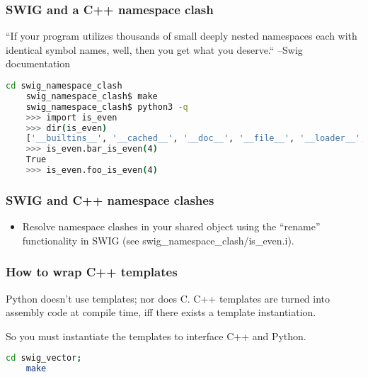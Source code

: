 \documentclass{beamer}
\begin{document}
\begin{frame}[fragile]
  \frametitle{SWIG and a C++ namespace clash}
  ``If your program utilizes thousands of small deeply nested namespaces each with identical symbol names, well, then
  you get what you deserve.`` --Swig documentation
  \begin{lstlisting}[language=bash]
    cd swig_namespace_clash
    swig_namespace_clash$ make
    swig_namespace_clash$ python3 -q
    >>> import is_even
    >>> dir(is_even)
    ['__builtins__', '__cached__', '__doc__', '__file__', '__loader__', '__name__', '__package__', '__spec__', '_is_even', '_newclass', '_object', '_swig_getattr', '_swig_getattr_nondynamic', '_swig_property', '_swig_repr', '_swig_setattr', '_swig_setattr_nondynamic', 'bar_is_even', 'foo_is_even']
    >>> is_even.bar_is_even(4)
    True
    >>> is_even.foo_is_even(4)
   \end{lstlisting}
\end{frame}

\begin{frame}[fragile]
  \frametitle{SWIG and C++ namespace clashes}
  \begin{itemize}
    \item Resolve namespace clashes in your shared object using the ``rename'' functionality in SWIG (see swig\_namespace\_clash/is\_even.i).
  \end{itemize}
\end{frame}

\begin{frame}[fragile]
  \frametitle{How to wrap C++ templates}

  Python doesn't use templates; nor does C. C++ templates are turned into assembly code at compile time, iff there exists a template instantiation.

  So you must instantiate the templates to interface C++ and Python.

  \begin{lstlisting}[language=bash]
    cd swig_vector;
    make
  \end{lstlisting}

\end{frame}
\end{document}
